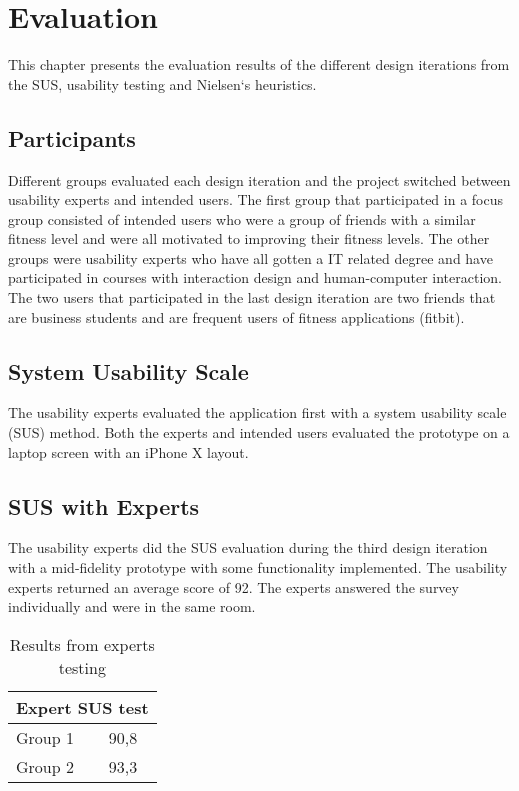 \chapter{Evaluation}
This chapter presents the evaluation results of the different design iterations from the SUS, usability testing and Nielsen`s heuristics.

\section{Participants}
Different groups evaluated each design iteration and the project switched between usability experts and intended users. The first group that participated in a focus group consisted of intended users who were a group of friends with a similar fitness level and were all motivated to improving their fitness levels. The other groups were usability experts who have all gotten a IT related degree and have participated in courses with interaction design and human-computer interaction. The two users that participated in the last design iteration are two friends that are business students and are frequent users of fitness applications (fitbit).

\section{System Usability Scale}
The usability experts evaluated the application first with a system usability scale (SUS) method. Both the experts and intended users evaluated the prototype on a laptop screen with an iPhone X layout. 

\section{SUS with Experts}\label{suse}
The usability experts did the SUS evaluation during the third design iteration with a mid-fidelity prototype with some functionality implemented. The usability experts returned an average score of 92. The experts answered the survey individually and were in the same room.
\begin{table}[H]
\centering
\begin{tabular}{ |l|l| }
  \hline
  \multicolumn{2}{|c|}{Expert SUS test} \\
  \hline
Group 1 & 90,8\\ 
\hline
Group 2 & 93,3\\
\hline
\end{tabular}
\caption{Results from experts testing}
\end{table}

